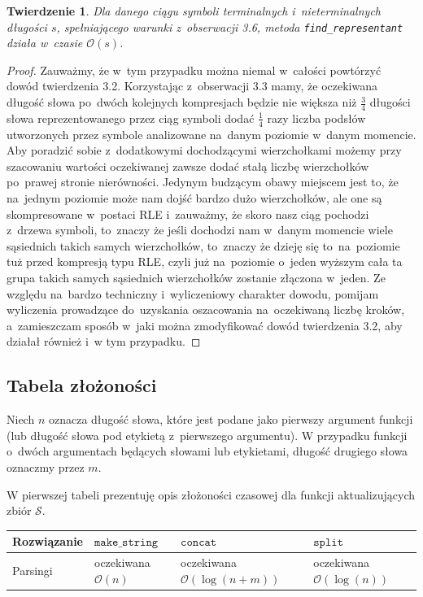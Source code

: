 \documentclass[declaration,shortabstract]{iithesis}
\theoremstyle{definition} \newtheorem{definition}{Definicja}[chapter]
\theoremstyle{remark} \newtheorem{remark}[definition]{Obserwacja}
\theoremstyle{plain} \newtheorem{theorem}[definition]{Twierdzenie}
\theoremstyle{remark} \newtheorem{example}{Przykład}[definition]
\theoremstyle{plain} \newtheorem{lemma}[definition]{Lemat}
\begin{document}
\begin{theorem}
    Dla danego ciągu symboli terminalnych i~nieterminalnych długości $s$, spełniającego warunki z~obserwacji 3.6, metoda \texttt{find\_representant} działa w~czasie $\mathcal{O}(s)$.
\end{theorem}

\begin{proof}
    Zauważmy, że w~tym przypadku można niemal w~całości powtórzyć dowód twierdzenia 3.2. Korzystając z~obserwacji 3.3 mamy, że oczekiwana długość słowa po~dwóch kolejnych kompresjach będzie nie większa niż $\frac{3}{4}$ długości słowa reprezentowanego przez ciąg symboli dodać $\frac{1}{4}$ razy liczba podsłów utworzonych przez symbole analizowane na~danym poziomie w~danym momencie. Aby poradzić sobie z~dodatkowymi dochodzącymi wierzchołkami możemy przy szacowaniu wartości oczekiwanej zawsze dodać stałą liczbę wierzchołków po~prawej stronie nierówności. Jedynym budzącym obawy miejscem jest to, że na~jednym poziomie może nam dojść bardzo dużo wierzchołków, ale one są skompresowane w~postaci RLE i~zauważmy, że skoro nasz ciąg pochodzi z~drzewa symboli, to~znaczy że jeśli dochodzi nam w~danym momencie wiele sąsiednich takich samych wierzchołków, to~znaczy że dzieję się to~na~poziomie tuż przed kompresją typu RLE, czyli już na~poziomie o~jeden wyższym cała ta grupa takich samych sąsiednich wierzchołków zostanie złączona w~jeden. Ze względu na~bardzo techniczny i~wyliczeniowy charakter dowodu, pomijam wyliczenia prowadzące do~uzyskania oszacowania na~oczekiwaną liczbę kroków, a~zamieszczam sposób w~jaki można zmodyfikować dowód twierdzenia 3.2, aby działał również i~w tym przypadku.
\end{proof}

\subsection{Tabela złożoności}

Niech $n$ oznacza długość słowa, które jest podane jako pierwszy argument funkcji (lub długość słowa pod etykietą z~pierwszego argumentu). W przypadku funkcji o~dwóch argumentach będących słowami lub etykietami, długość drugiego słowa oznaczmy przez $m$.

W pierwszej tabeli prezentuję opis złożoności czasowej dla funkcji aktualizujących zbiór $\mathcal{S}$.

\begin{center}
    \begin{tabular}{ | m{3cm} | >{\centering\arraybackslash}m{3cm} | >{\centering\arraybackslash}m{3cm} | >{\centering\arraybackslash}m{3cm} | }
        \hline 
        Rozwiązanie & $\texttt{make\_string}$ & $\texttt{concat}$ & $\texttt{split}$ \\
        \hline
        Parsingi & oczekiwana $\mathcal{O}(n)$ & oczekiwana $\mathcal{O}(\log(n + m))$ & oczekiwana $\mathcal{O}(\log(n))$ \\
        \hline
    \end{tabular}
\end{center}
\end{document}
